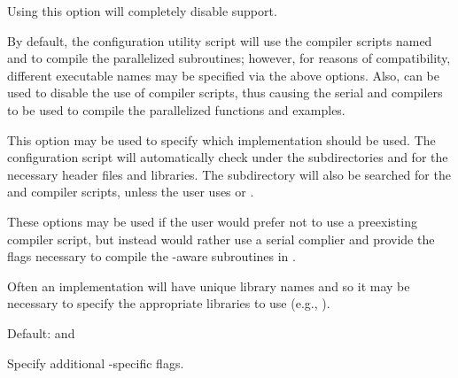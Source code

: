 \begin{config}
  
\item {}

  Using this option will completely disable {\mpi} support.

\item {}
\item {}

  By default, the configuration utility script will use the {\mpi} compiler
  scripts named  and  to compile the parallelized
  {\sundials} subroutines; however, for reasons of compatibility, different
  executable names may be specified via the above options. Also, 
  can be used to disable the use of {\mpi} compiler scripts, thus causing
  the serial {\C} and {\F} compilers to be used to compile the parallelized
  {\sundials} functions and examples.

\item {}

  This option may be used to specify which {\mpi} implementation should be used.
  The {\sundials} configuration script will automatically check under the
  subdirectories  and  for the necessary
  header files and libraries. The subdirectory  will also be
  searched for the {\C} and {\F} {\mpi} compiler scripts, unless the user uses
   or .

\item {}
\item {}
\item {}

  These options may be used if the user would prefer not to use a preexisting
  {\mpi} compiler script, but instead would rather use a serial complier and
  provide the flags necessary to compile the {\mpi}-aware subroutines in
  {\sundials}.

  Often an {\mpi} implementation will have unique library names and so it may
  be necessary to specify the appropriate libraries to use (e.g.,
  ).

  Default:  and 

\item {}

  Specify additional {\mpi}-specific flags.

\end{config}


